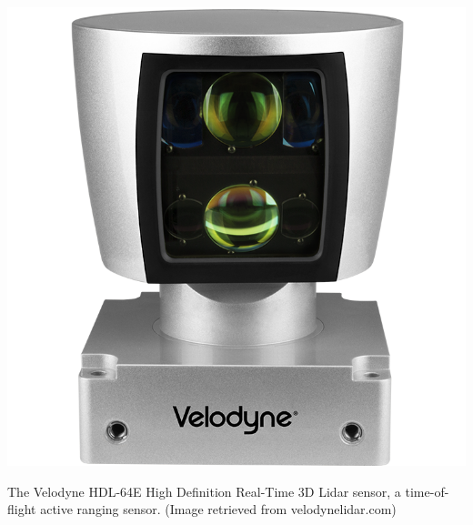 \begin{marginfigure}
\centering
\includegraphics[scale=0.8]{tex/figs/ch08_figs/Velodyne_64e.png}
\caption{The Velodyne HDL-64E High Definition Real-Time 3D Lidar sensor, a time-of-flight active ranging sensor. (Image retrieved from velodynelidar.com)}
\label{fig:active_range}
\end{marginfigure}

